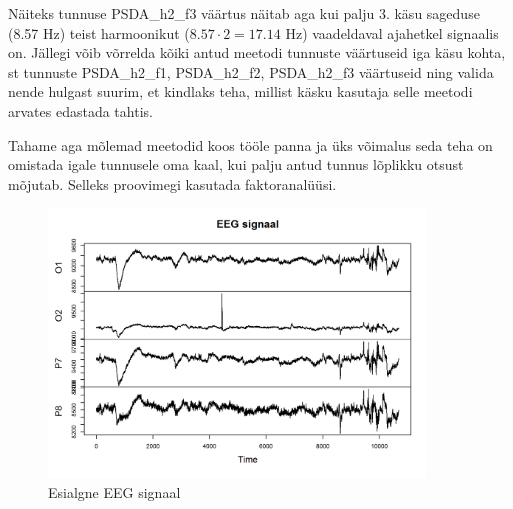 \documentclass[a4paper,12pt]{report}
\begin{document}
Näiteks tunnuse PSDA\_h2\_f3 väärtus näitab aga kui palju 3. käsu sageduse (8.57 Hz) teist harmoonikut ($8.57\cdot2=17.14$ Hz) vaadeldaval ajahetkel signaalis on. Jällegi võib võrrelda kõiki antud meetodi tunnuste väärtuseid iga käsu kohta, st tunnuste PSDA\_h2\_f1, PSDA\_h2\_f2, PSDA\_h2\_f3 väärtuseid ning valida nende hulgast suurim, et kindlaks teha, millist käsku kasutaja selle meetodi arvates edastada tahtis.

Tahame aga mõlemad meetodid koos tööle panna ja üks võimalus seda teha on omistada igale tunnusele oma kaal, kui palju antud tunnus lõplikku otsust mõjutab. Selleks proovimegi kasutada faktoranalüüsi.



\begin{figure}[h!]
	\centering
	\includegraphics[width=10cm]{./eeg.png}
	\caption{Esialgne EEG signaal}
	\label{eeg}
\end{figure}
\end{document}
